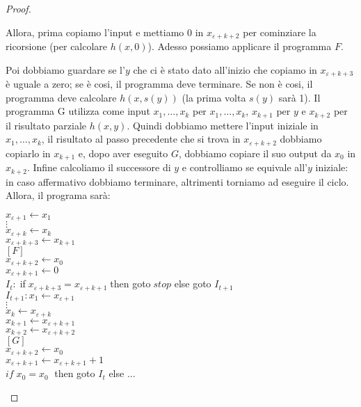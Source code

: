 \begin{proof}
\begin{enumerate}
Allora, prima copiamo l'input e mettiamo 0 in $x_{\varepsilon+k+2}$
per cominziare la ricorsione (per calcolare $h(x,0)$). Adesso possiamo
applicare il programma $F$.

Poi dobbiamo guardare se l'$y$ che ci è stato dato all'inizio che copiamo
in $x_{\varepsilon+k+3}$ è uguale
a zero; se è cosi, il programma deve terminare. Se non è cosi, il
programma deve calcolare $h(x,s(y))$ (la prima volta $s(y)$ sarà
1). Il programma G utilizza come input $x_{1},\dots,x_{k}$ per
$x_{1},\dots,x_{k}$, $x_{k+1}$ per $y$ e $x_{k+2}$ per il risultato
parziale $h(x,y)$. Quindi dobbiamo mettere l'input iniziale in
$x_{1},\dots,x_{k}$, il risultato al passo precedente che si trova in
$x_{\varepsilon+k+2}$ dobbiamo copiarlo in $x_{k+1}$ e, dopo aver
eseguito $G$, dobbiamo copiare il suo output da $x_{0}$ in $x_{k+2}$.
Infine calcoliamo il successore di $y$ e controlliamo se equivale
all'$y$ iniziale: in caso affermativo dobbiamo terminare, altrimenti
torniamo ad eseguire il ciclo. Allora, il programa sarà:

\begin{mylisting}
$x_{\varepsilon+1}\leftarrow x_{1}$\\
$\vdots$\\
$x_{\varepsilon+k}\leftarrow x_{k}$\\
$x_{\varepsilon+k+3}\leftarrow x_{k+1}$ \\
$[F]$\\
$x_{\varepsilon+k+2}\leftarrow x_{0}$\\
$x_{\varepsilon+k+1}\leftarrow 0$\\
$I_t:\; $if$\; x_{\varepsilon+k+3}=x_{\varepsilon+k+1}\; $then goto$\;stop$ else goto $I_{t+1}$\\
$I_{t+1}:x_{1}\leftarrow x_{\varepsilon+1}$\\
$\vdots$\\
$x_{k}\leftarrow x_{\varepsilon+k}$\\
$x_{k+1}\leftarrow x_{\varepsilon+k+1}$\\
$x_{k+2} \leftarrow x_{\varepsilon+k+2}$\\
$[G]$\\
$x_{\varepsilon+k+2} \leftarrow x_0$\\
$x_{\varepsilon+k+1}\leftarrow x_{\varepsilon+k+1}+1$\\
$if \; x_0=x_0\; $ then goto $I_t$ else ...
\end{mylisting}
\end{enumerate}
\end{proof}

